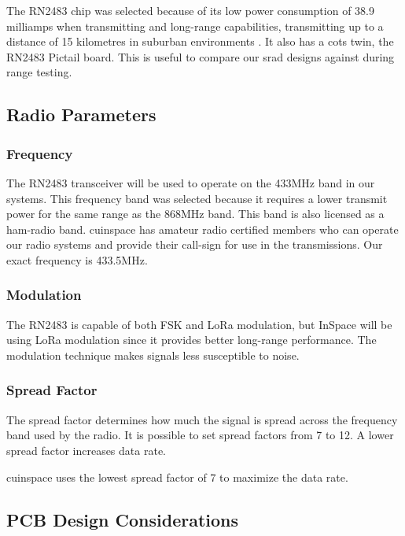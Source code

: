 The RN2483 chip was selected because of its low power consumption of 38.9 milliamps when transmitting \cite[Table
    2-3]{rn2483-datasheet} and long-range capabilities, transmitting up to a distance of 15 kilometres in suburban
environments \cite[1]{rn2483-datasheet}. It also has a \gls{cots} twin, the RN2483 Pictail board. This is useful to
compare our \gls{srad} designs against during range testing.

\subsection{Radio Parameters}

\subsubsection{Frequency}

The RN2483 transceiver will be used to operate on the 433MHz band in our systems. This frequency band was selected
because it requires a lower transmit power for the same range \cite[Table 2-5]{rn2483-datasheet} as the 868MHz band.
This band is also licensed as a \gls{ham-radio} band. \Gls{cuinspace} has amateur radio certified members who can
operate our radio systems and provide their call-sign for use in the transmissions. Our exact frequency is 433.5MHz.

\subsubsection{Modulation}

The RN2483 is capable of both FSK and LoRa modulation, but InSpace will be using LoRa modulation since it provides
better long-range performance. The modulation technique makes signals less susceptible to noise.

\subsubsection{Spread Factor}

The spread factor determines how much the signal is spread across the frequency band used by the radio. It is possible
to set spread factors from 7 to 12. \cite[Sec. 2.5.5.14]{rn2483-commands} A lower spread factor increases data rate.

\Gls{cuinspace} uses the lowest spread factor of 7 to maximize the data rate.

\subsection{PCB Design Considerations}

